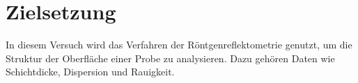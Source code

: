 \section{Zielsetzung}
\label{sec:zielsetzung}
In diesem Versuch wird das Verfahren der Röntgenreflektometrie genutzt, um die Struktur der Oberfläche einer Probe zu analysieren. Dazu gehören Daten wie Schichtdicke, Dispersion und Rauigkeit.

